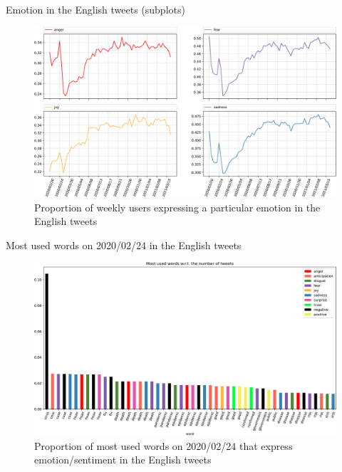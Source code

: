 \documentclass[8pt]{beamer}  %
\begin{document}
\begin{frame}{Emotion in the English tweets (subplots)}

    \begin{figure}[H]
	    \centering
    	\includegraphics[scale=.25]{assets/img/en_4_emotions_subplot_1.svg.pdf}
    	\caption{Proportion of weekly users expressing a particular emotion in the English tweets}
    	\label{fig:en-4-emotions-subplot-1}
    \end{figure}
    
\end{frame}

\begin{frame}{Most used words on 2020/02/24 in the English tweets}

    \begin{figure}[H]
	    \centering
    	\includegraphics[scale=.25]{assets/img/en_most_used_words_2020_02_24.svg.pdf}
    	\caption{Proportion of most used words on 2020/02/24 that express emotion/sentiment in the English tweets}
    	\label{fig:en-most-used-word-2020-02-24}
    \end{figure}
    
\end{frame}
\end{document}
